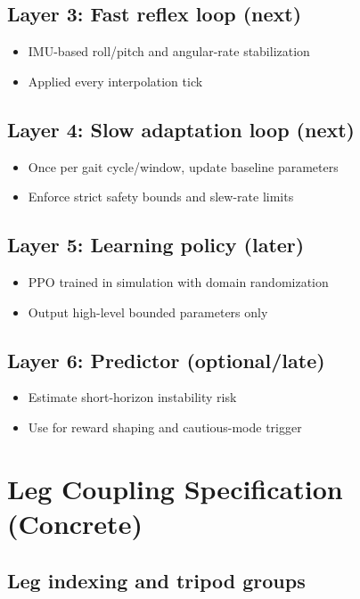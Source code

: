 \documentclass[11pt]{article}
\begin{document}
\subsection*{Layer 3: Fast reflex loop (next)}
\begin{itemize}
    \item IMU-based roll/pitch and angular-rate stabilization
    \item Applied every interpolation tick
\end{itemize}

\subsection*{Layer 4: Slow adaptation loop (next)}
\begin{itemize}
    \item Once per gait cycle/window, update baseline parameters
    \item Enforce strict safety bounds and slew-rate limits
\end{itemize}

\subsection*{Layer 5: Learning policy (later)}
\begin{itemize}
    \item PPO trained in simulation with domain randomization
    \item Output high-level bounded parameters only
\end{itemize}

\subsection*{Layer 6: Predictor (optional/late)}
\begin{itemize}
    \item Estimate short-horizon instability risk
    \item Use for reward shaping and cautious-mode trigger
\end{itemize}

\section{Leg Coupling Specification (Concrete)}

\subsection*{Leg indexing and tripod groups}
\end{document}
